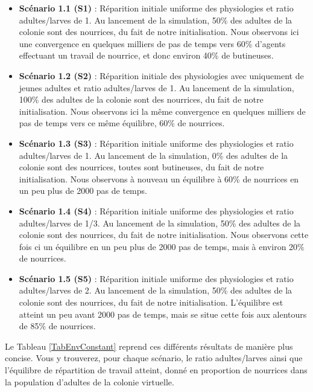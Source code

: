 	\begin{itemize}
		\item \textbf{Scénario 1.1 (S1)} : Réparition initiale uniforme des physiologies et ratio adultes/larves de 1. Au lancement de la simulation, 50\% des adultes de la colonie sont des nourrices, du fait de notre initialisation. Nous observons ici une convergence en quelques milliers de pas de temps vers 60\% d'agents effectuant un travail de nourrice, et donc environ 40\% de butineuses.
		
		\item \textbf{Scénario 1.2 (S2)} : Réparition initiale des physiologies avec uniquement de jeunes adultes et ratio adultes/larves de 1. Au lancement de la simulation, 100\% des adultes de la colonie sont des nourrices, du fait de notre initialisation. Nous observons ici la même convergence en quelques milliers de pas de temps vers ce même équilibre, 60\% de nourrices.
		
		\item \textbf{Scénario 1.3 (S3)} : Réparition initiale uniforme des physiologies et ratio adultes/larves de 1. Au lancement de la simulation, 0\% des adultes de la colonie sont des nourrices, toutes sont butineuses, du fait de notre initialisation. Nous observons à nouveau un équilibre à 60\% de nourrices en un peu plus de 2000 pas de temps.
		
		\item \textbf{Scénario 1.4 (S4)} : Réparition initiale uniforme des physiologies et ratio adultes/larves de 1/3. Au lancement de la simulation, 50\% des adultes de la colonie sont des nourrices, du fait de notre initialisation. Nous observons cette fois ci un équilibre en un peu plus de 2000 pas de temps, mais à environ 20\% de nourrices.
		
		\item \textbf{Scénario 1.5 (S5)} : Réparition initiale uniforme des physiologies et ratio adultes/larves de 2. Au lancement de la simulation, 50\% des adultes de la colonie sont des nourrices, du fait de notre initialisation. L'équilibre est atteint un peu avant 2000 pas de temps, mais se situe cette fois aux alentours de 85\% de nourrices.		
	\end{itemize}
	
	Le Tableau \ref{TabEnvConstant} reprend ces différents résultats de manière plus concise. Vous y trouverez, pour chaque scénario, le ratio adultes/larves ainsi que l'équilibre de répartition de travail atteint, donné en proportion de nourrices dans la population d'adultes de la colonie virtuelle.
	
